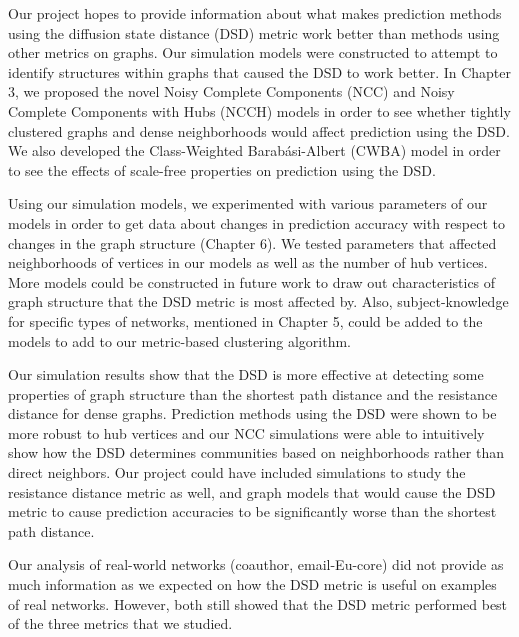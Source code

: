 Our project hopes to provide information about what makes prediction methods using the diffusion
state distance (DSD) metric work better than methods using other metrics on graphs. Our simulation
models were constructed to attempt to identify structures within graphs that caused the DSD to work
better. In Chapter 3, we proposed the novel Noisy Complete Components (NCC) and Noisy Complete
Components with Hubs (NCCH) models in order to see whether tightly clustered graphs and dense
neighborhoods would affect prediction using the DSD. We also developed the Class-Weighted
Barab\'{a}si-Albert (CWBA) model in order to see the effects of scale-free properties on prediction
using the DSD.

Using our simulation models, we experimented with various parameters of our models in order to get data about changes in prediction accuracy with respect to changes in the graph structure (Chapter 6). We tested parameters that affected neighborhoods of vertices in our models as well as the number of hub vertices. More models could be constructed in future work to draw out characteristics of graph structure that the DSD metric is most affected by. Also, subject-knowledge for specific types of networks, mentioned in Chapter 5, could be added to the models to add to our metric-based clustering algorithm.

Our simulation results show that the DSD is more effective at detecting some 
properties of graph structure than the shortest path distance and the
resistance distance for dense graphs. Prediction methods using the DSD were 
shown to be more robust to hub vertices and our NCC simulations were able to
intuitively show how the DSD determines communities based on neighborhoods 
rather than direct neighbors. Our project could have included simulations to
study the resistance distance metric as well, and graph models that would
cause the DSD metric to cause prediction accuracies to be significantly 
worse than the shortest path distance.

Our analysis of real-world networks (coauthor, email-Eu-core) did not provide
as much information as we expected on how the DSD metric is useful on examples
of real networks. However, both still showed that the DSD metric performed
best of the three metrics that we studied.

